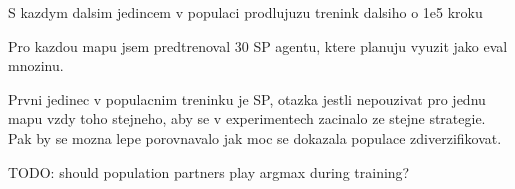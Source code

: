 \documentclass{report}
\begin{document}
\begin{list}{}{}
    \item S kazdym dalsim jedincem v populaci prodlujuzu trenink dalsiho o 1e5 kroku
    \item Pro kazdou mapu jsem predtrenoval 30 SP agentu, ktere planuju vyuzit jako eval mnozinu.
    \item Prvni jedinec v populacnim treninku je SP, otazka jestli nepouzivat pro jednu mapu vzdy toho stejneho, aby se v experimentech zacinalo ze stejne strategie. Pak by se mozna lepe porovnavalo jak moc se dokazala populace zdiverzifikovat.
    \item TODO: should population partners play argmax during training?
\end{list}
\end{document}
